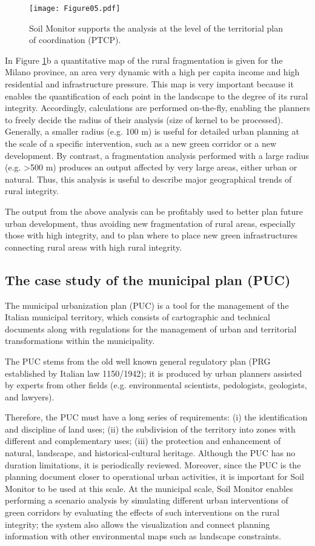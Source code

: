 \documentclass[APA,LATO1COL,doublespace]{WileyNJD-v2}
\begin{document}
\begin{figure}[t]
    \centerline{\texttt{[image: Figure05.pdf]}}
    \caption{ Soil Monitor supports the analysis at the level of the territorial plan of coordination (PTCP). } \label{fig:casePROV}
\end{figure}

In Figure \ref{fig:casePROV}b a quantitative map of the rural fragmentation is given for the Milano province, an area very dynamic with a high per capita income and high residential and infrastructure pressure. 
This map is very important because it enables the quantification of each point in the landscape to the degree of its rural integrity. 
Accordingly, calculations are performed on-the-fly, enabling the planners to freely decide the radius of their analysis (size of kernel to be processed).
Generally, a smaller radius (e.g. 100 m) is useful for detailed urban planning at the scale of a specific intervention, such as a new green corridor or a new development.
By contrast, a fragmentation analysis performed with a large radius (e.g. >500 m) produces an output affected by very large areas, either urban or natural. 
Thus, this analysis is useful to describe major geographical trends of rural integrity.

The output from the above analysis can be profitably used to better plan future urban development, thus avoiding new fragmentation of rural areas, especially those with high integrity, and to plan where to place new green infrastructures connecting rural areas with high rural integrity.

\subsection{The case study of the municipal plan (PUC)}
The municipal urbanization plan (PUC) is a tool for the management of the Italian municipal territory, which consists of cartographic and technical documents along with regulations for the management of urban and territorial transformations within the municipality.

The PUC stems from the old well known general regulatory plan (PRG established by Italian law 1150/1942); it is produced by urban planners assisted by experts from other fields (e.g. environmental scientists, pedologists, geologists, and lawyers).

Therefore, the PUC must have a long series of requirements: (i) the identification and discipline of land uses; (ii) the subdivision of the territory into zones with different and complementary uses; (iii) the protection and enhancement of natural, landscape, and historical-cultural heritage. 
Although the PUC has no duration limitations, it is periodically reviewed.
Moreover, since the PUC is the planning document closer to operational urban activities, it is important for Soil Monitor to be used at this scale. 
At the municipal scale, Soil Monitor enables performing a scenario analysis by simulating different urban interventions of green corridors by evaluating the effects of such interventions on the rural integrity; the system also allows the visualization and connect planning information with other environmental maps such as landscape constraints.
\end{document}
